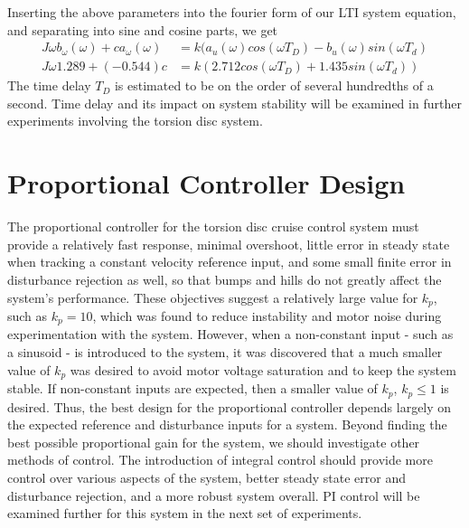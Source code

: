 \documentclass[11pt,titlepage]{article}
\begin{document}
        \noindent Inserting the above parameters into the fourier form of our LTI system equation, and separating into sine and cosine parts, we get
        \begin{align}
            J\omega b_{\omega}(\omega)+ca_{\omega}(\omega)&=k(a_u(\omega)cos(\omega T_D)-b_u(\omega)sin(\omega T_d)\\
            J\omega 1.289+(-0.544)c&=k(2.712cos(\omega T_D)+1.435sin(\omega T_d))
        \end{align}
        The time delay $T_D$ is estimated to be on the order of several hundredths of a second. Time delay and its impact on system stability will be examined in further experiments involving the torsion disc system. 
\section{Proportional Controller Design}
    The proportional controller for the torsion disc cruise control system must provide a relatively fast response, minimal overshoot, little error in steady state when tracking a constant velocity reference input, and some small finite error in disturbance rejection as well, so that bumps and hills do not greatly affect the system's performance. These objectives suggest a relatively large value for $k_p$, such as $k_p=10$, which was found to reduce instability and motor noise during experimentation with the system. However, when a non-constant input - such as a sinusoid - is introduced to the system, it was discovered that a much smaller value of $k_p$ was desired to avoid motor voltage saturation and to keep the system stable. If non-constant inputs are expected, then a smaller value of $k_p$, $k_p\leq1$ is desired. Thus, the best design for the proportional controller depends largely on the expected reference and disturbance inputs for a system. Beyond finding the best possible proportional gain for the system, we should investigate other methods of control. The introduction of integral control should provide more control over various aspects of the system, better steady state error and disturbance rejection, and a more robust system overall. PI control will be examined further for this system in the next set of experiments. 
\end{document}
